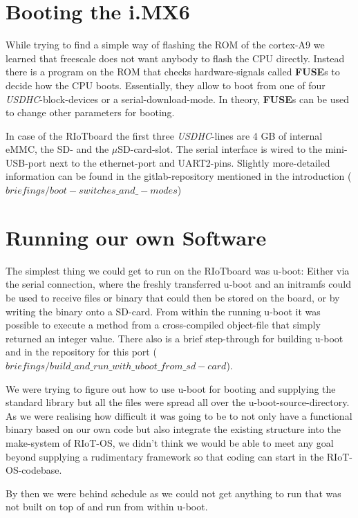 \section{Booting the i.MX6}

While trying to find a simple way of flashing the ROM of the cortex-A9 we learned that
freescale does not want anybody to flash the CPU directly. Instead there is a program on
the ROM that checks hardware-signals called \textbf{FUSE}s to decide how the CPU boots.
Essentially, they allow to boot from one of four \textit{USDHC}-block-devices or a
serial-download-mode. In theory, \textbf{FUSE}s can be used to change other
parameters for booting.

In case of the RIoTboard the first three \textit{USDHC}-lines are 4 GB of internal eMMC,
the SD- and the $\mu$SD-card-slot. The serial interface is wired to the mini-USB-port
next to the ethernet-port and UART2-pins.
Slightly more-detailed information can be found in the gitlab-repository mentioned in
the introduction (\textit{$briefings/boot-switches\_and\_-modes$})

\section{Running our own Software}

The simplest thing we could get to run on the RIoTboard was u-boot: Either via the serial
connection, where the freshly transferred u-boot and an initramfs could be used to
receive files or binary that could then be stored on the board, or by writing the binary
onto a SD-card. From within the running u-boot it was possible to execute a method from
a cross-compiled object-file that simply returned an integer value.
There also is a brief step-through for building u-boot and in the repository for this
port (\textit{$briefings/build\_and\_run\_with\_uboot\_from\_sd-card$}).

We were trying to figure out how to use u-boot for booting and supplying the standard
library but all the files were spread all over the u-boot-source-directory.
As we were realising how difficult it was going to be to not only have a functional
binary based on our own code but also integrate the existing structure into the
make-system of RIoT-OS, we didn't think we would be able to meet any goal beyond
supplying a rudimentary framework so that coding can start in the RIoT-OS-codebase.

By then we were behind schedule as we could not get anything to run that was not built
on top of and run from within u-boot.

